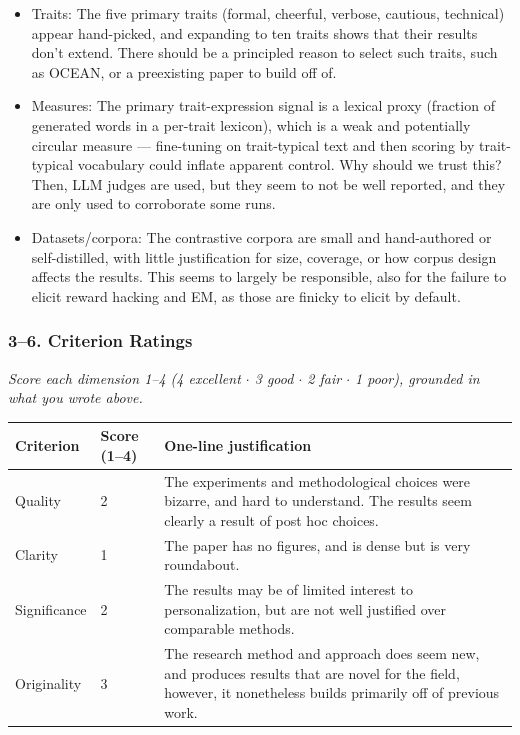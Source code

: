 \begin{itemize}
\begin{itemize}
  \item Traits: The five primary traits (formal, cheerful, verbose, cautious,
  technical) appear hand-picked, and expanding to ten traits shows that their
  results don't extend. There should be a principled reason to select such
  traits, such as OCEAN, or a preexisting paper to build off of.
  \item Measures: The primary trait-expression signal is a lexical proxy
  (fraction of generated words in a per-trait lexicon), which is a weak and
  potentially circular measure --- fine-tuning on trait-typical text and then
  scoring by trait-typical vocabulary could inflate apparent control. Why
  should we trust this? Then, LLM judges are used, but they seem to not be well
  reported, and they are only used to corroborate some runs.
  \item Datasets/corpora: The contrastive corpora are small and hand-authored
  or self-distilled, with little justification for size, coverage, or how
  corpus design affects the results. This seems to largely be responsible, also
  for the failure to elicit reward hacking and EM, as those are finicky to
  elicit by default.
\end{itemize}
\end{itemize}
\subsubsection*{3--6. Criterion Ratings}
{\itshape Score each dimension 1--4 (4 excellent \(\cdot\) 3 good \(\cdot\) 2
fair \(\cdot\) 1 poor), grounded in what you wrote above.}

\begin{center}
\begin{tabular}{@{}P{0.16\textwidth}P{0.12\textwidth}P{0.60\textwidth}@{}}
\toprule
\textbf{Criterion} & \textbf{Score (1--4)} & \textbf{One-line justification} \\
\midrule
Quality & 2 & The experiments and methodological choices were bizarre, and hard
to understand. The results seem clearly a result of post hoc choices. \\
Clarity & 1 & The paper has no figures, and is dense but is very roundabout. \\
Significance & 2 & The results may be of limited interest to personalization,
but are not well justified over comparable methods. \\
Originality & 3 & The research method and approach does seem new, and produces
results that are novel for the field, however, it nonetheless builds primarily
off of previous work. \\
\bottomrule
\end{tabular}
\end{center}

